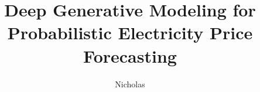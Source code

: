 \documentclass[defaultstyle,11pt]{thesis}
\title{Deep Generative Modeling for Probabilistic Electricity Price Forecasting}
\author{Nicholas}{Elsasser}
\begin{document}








\nocite{*}		%

\appendix






\end{document}
